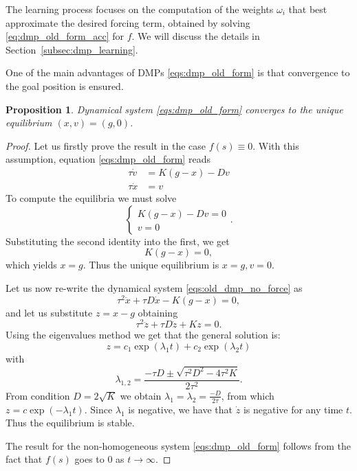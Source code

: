 \documentclass[fleqn, 11pt]{article}
\theoremstyle{definition}
\theoremstyle{plain}
\newtheorem{prop}{Proposition}[section]
\theoremstyle{remark}
\begin{document}
The learning process focuses on the computation of the weights $\omega_i$ that best approximate the desired forcing term, obtained by solving \eqref{eq:dmp_old_form_acc} for $f$.
We will discuss the details in Section~\ref{subsec:dmp_learning}.

One of the main advantages of DMPs \eqref{eqs:dmp_old_form} is that convergence to the goal position is ensured.

\begin{prop}\label{prop:old_dmp_stab}
    Dynamical system \eqref{eqs:dmp_old_form} converges to the unique equilibrium $ (x, v) = (g, 0) $.
\end{prop}
\begin{proof}
    Let us firstly prove the result in the case $ f(s) \equiv 0 $.
    With this assumption, equation \eqref{eqs:dmp_old_form} reads
    \begin{subequations}
        \label{eqs:old_dmp_no_force}
        \begin{align}
            \tau \dot{v} & = K(g - x) - Dv \\
            \tau \dot{x} & = v
        \end{align}
    \end{subequations}
    To compute the equilibria we must solve
    \[\begin{cases}
        K (g - x) - Dv = 0 \\
        v = 0
    \end{cases}.\]
    Substituting the second identity into the first, we get
    \[ K (g - x) = 0, \]
    which yields $ x = g $.
    Thus the unique equilibrium is $ x = g, v = 0 $.

    Let us now re-write the dynamical system \eqref{eqs:old_dmp_no_force} as
    \[ \tau ^ 2 \ddot{x} + \tau D \dot{x} - K (g - x) = 0, \]
    and let us substitute $ z = x - g $ obtaining
    \[ \tau ^ 2 \ddot{z} + \tau D \dot{z} + K z = 0 . \]
    Using the eigenvalues method we get that the general solution is:
    \[ z = c_1 \exp ( {\lambda_1 t} ) + c_2 \exp ( {\lambda_2 t} ) \]
    with
    \[ \lambda_{1,2} = \frac{ - \tau D \pm \sqrt{ \tau ^ 2 D ^ 2 - 4 \tau ^ 2 K } }{ 2 \tau ^ 2 } . \]
    From condition \( D = 2 \sqrt{K} \) we obtain $ \lambda_1 = \lambda_2 = \frac{- D}{ 2 \tau} $, from which $ z = c \exp (-\lambda_1 t) $.
    Since $ \lambda_1 $ is negative, we have that $ \dot{z} $ is negative for any time $t$.
    Thus the equilibrium is stable.

    The result for the non-homogeneous system \eqref{eqs:dmp_old_form} follows from the fact that $ f(s) $ goes to $ 0 $ as $ t \to \infty $.
\end{proof}
\end{document}

